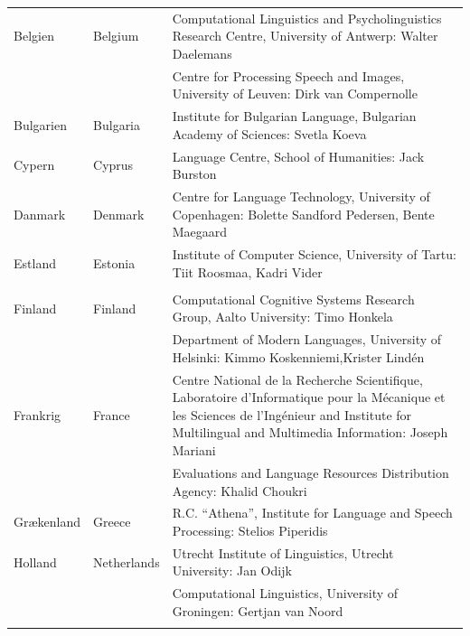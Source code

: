 \small
\begin{longtable}{llp{105mm}}
  Belgien & \textcolor{grey1}{Belgium} & Computational Linguistics and Psycholinguistics Research Centre, University of Antwerp: Walter Daelemans\\ \addlinespace
  & & Centre for Processing Speech and Images, University of Leuven: Dirk van Compernolle \\ \addlinespace 
  
Bulgarien & \textcolor{grey1}{Bulgaria} & Institute for Bulgarian Language, Bulgarian Academy of Sciences: Svetla Koeva \\ \addlinespace

Cypern & \textcolor{grey1}{Cyprus} & Language Centre, School of Humanities: Jack Burston \\ \addlinespace

Danmark &  \textcolor{grey1}{Denmark} & Centre for Language Technology, University of Copenhagen: \newline Bolette Sandford Pedersen, Bente Maegaard\\ \addlinespace

  Estland & \textcolor{grey1}{Estonia} & Institute of Computer Science, University of Tartu: Tiit Roosmaa, Kadri Vider\\ \addlinespace\\ \addlinespace
  
  Finland & \textcolor{grey1}{Finland} & Computational Cognitive Systems Research Group, Aalto University: Timo Honkela\\ \addlinespace
  & & Department of Modern Languages, University of Helsinki: Kimmo Koskenniemi,\newline Krister Lindén \\ \addlinespace

  Frankrig & \textcolor{grey1}{France} & Centre National de la Recherche Scientifique, Laboratoire d'Informatique pour la Mécanique et les Sciences de l'Ingénieur and Institute for Multilingual and Multimedia Information: Joseph Mariani \\ \addlinespace
  & & Evaluations and Language Resources Distribution Agency: Khalid Choukri\\ \addlinespace
  
  Gr\ae kenland & \textcolor{grey1}{Greece} & R.C. “Athena”, Institute for Language and Speech Processing: Stelios Piperidis\\ \addlinespace
  
 Holland & \textcolor{grey1}{Netherlands} & Utrecht Institute of Linguistics, Utrecht University: Jan Odijk\\ \addlinespace 
  & & Computational Linguistics, University of Groningen: Gertjan van Noord\\ \addlinespace
  

\end{longtable}
